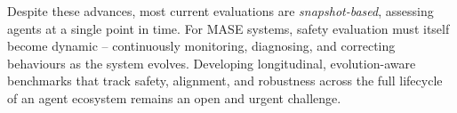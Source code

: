 Despite these advances, most current evaluations are \textit{snapshot-based}, assessing agents at a single point in time. For MASE systems, safety evaluation must itself become dynamic -- continuously monitoring, diagnosing, and correcting behaviours as the system evolves. Developing longitudinal, evolution-aware benchmarks that track safety, alignment, and robustness across the full lifecycle of an agent ecosystem remains an open and urgent challenge.